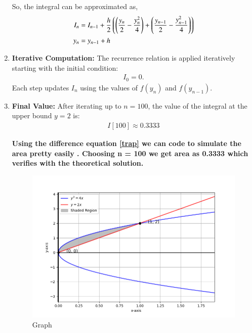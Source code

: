 \documentclass[journal]{IEEEtran}
\begin{document}
\begin{enumerate}
      So, the integral can be approximated as, 
    \begin{align}
    \label{trap}
    I_n &= I_{n-1} + \frac{h}{2} \left( \left(\frac{y_n}{2} - \frac{y_n^2}{4}\right) + \left(\frac{y_{n-1}}{2} - \frac{y_{n-1}^2}{4}\right)\right) \\ 
    y_n &= y_{n-1} + h
   \end{align}
    \item \textbf{Iterative Computation:}  
    The recurrence relation is applied iteratively starting with the initial condition:
    \begin{align}
    I_0 = 0.
    \end{align}
    Each step updates $I_n$ using the values of $f(y_n)$ and $f(y_{n-1})$. \\

    \item \textbf{Final Value:}  
    After iterating up to $n = 100$, the value of the integral at the upper bound $y = 2$ is:
    \begin{align}
    I[100] \approx 0.3333
    \end{align}

\textbf {Using the difference equation \eqref{trap} we can code to simulate the area pretty easily . Choosing n = 100 we get area as 0.3333 which verifies with the theoretical solution.}

	 \begin{figure}[h]  %
    \centering  %
    \includegraphics[width=\columnwidth]{fig/Figure_1.png}  
    \caption{Graph}
    \label{fig:example}  %
\end{figure}
\end{enumerate}
\end{document}
